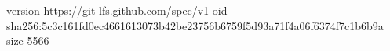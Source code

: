version https://git-lfs.github.com/spec/v1
oid sha256:5c3c161fd0ec4661613073b42be23756b6759f5d93a71f4a06f6374f7c1b6b9a
size 5566
